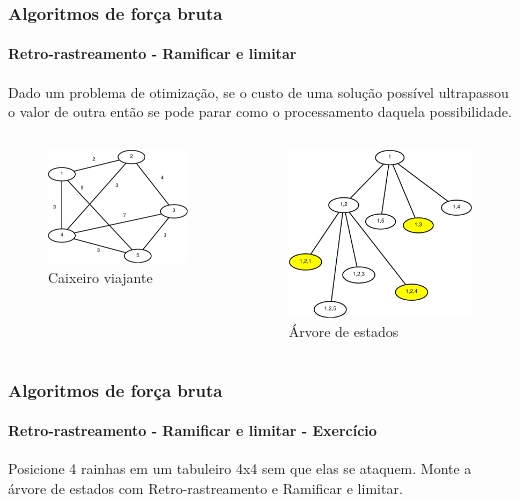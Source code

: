 \begin{frame}
	\frametitle{Algoritmos de força bruta}
	\framesubtitle{Retro-rastreamento - Ramificar e limitar}
	\par Dado um problema de otimização, se o custo de uma solução possível ultrapassou o valor de outra então se pode parar como o processamento daquela possibilidade.
		\begin{columns}
		\begin{column}{0.5\textwidth}
			\begin{figure}
				\centering
				\includegraphics[width=0.8\linewidth]{images/grafoForcaBruta}
				\caption{Caixeiro viajante}
				\label{fig:grafoforcabruta}
			\end{figure}
		\end{column}
		\begin{column}{0.5\textwidth}
			\begin{figure}
				\centering
				\includegraphics[width=0.8\linewidth]{images/arvoreEstadoForcaBruta}
				\caption{Árvore de estados}
				\label{fig:arvoreestadoforcabruta}
			\end{figure}
		\end{column}
	\end{columns}
\end{frame}

\begin{frame}
	\frametitle{Algoritmos de força bruta}
	\framesubtitle{Retro-rastreamento - Ramificar e limitar - Exercício}
	\par Posicione 4 rainhas em um tabuleiro 4x4 sem que elas se ataquem. Monte a árvore de estados com Retro-rastreamento e Ramificar e limitar.
\end{frame}